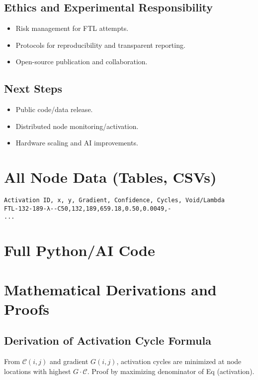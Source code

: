 \documentclass[12pt]{article}
\begin{document}
\subsection{Ethics and Experimental Responsibility}
\begin{itemize}
    \item Risk management for FTL attempts.
    \item Protocols for reproducibility and transparent reporting.
    \item Open-source publication and collaboration.
\end{itemize}

\subsection{Next Steps}
\begin{itemize}
    \item Public code/data release.
    \item Distributed node monitoring/activation.
    \item Hardware scaling and AI improvements.
\end{itemize}

\newpage
\appendix
\section{All Node Data (Tables, CSVs)}
\begin{lstlisting}
Activation ID, x, y, Gradient, Confidence, Cycles, Void/Lambda
FTL-132-189-λ--C50,132,189,659.18,0.50,0.0049,-
...
\end{lstlisting}

\section{Full Python/AI Code}

\section{Mathematical Derivations and Proofs}
\subsection{Derivation of Activation Cycle Formula}
From $\mathcal{C}(i,j)$ and gradient $G(i,j)$, activation cycles are minimized at node locations with highest $G \cdot \mathcal{C}$. Proof by maximizing denominator of Eq (activation).
\end{document}

